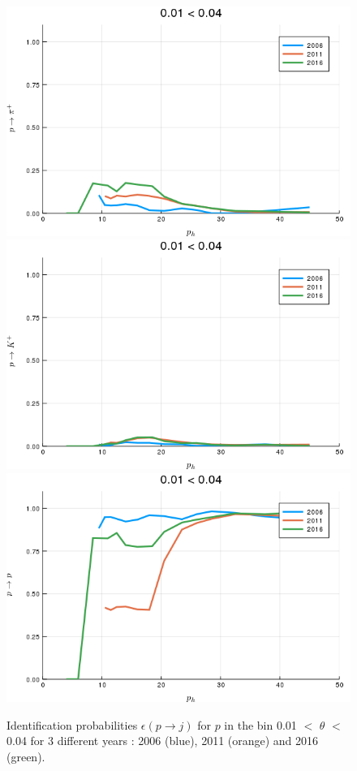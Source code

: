 \begin{figure}[!p]
  \centering
	\includegraphics[scale=0.35]{./gfx/t1/pp2pip.png}
  \includegraphics[scale=0.35]{./gfx/t1/pp2kp.png}
  \includegraphics[scale=0.35]{./gfx/t1/pp2pp.png}
	\caption{Identification probabilities $\epsilon(p \rightarrow j)$ for $p$ in the bin 0.01 $<$ $\theta$ $<$ 0.04 for 3 different years : 2006 (blue), 2011 (orange) and 2016 (green).}
	\label{pic:comppp}
\end{figure}

